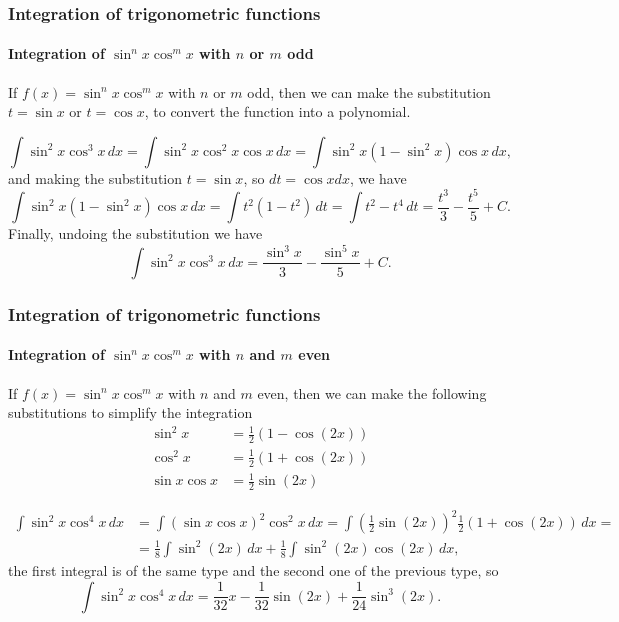 \begin{frame}
\frametitle{Integration of trigonometric functions}
\framesubtitle{Integration of $\sin^n x\cos^m x$ with $n$ or $m$ odd}
If $f(x)=\sin^n x\cos^m x$ with $n$ or $m$ odd, then we can make the substitution $t=\sin x$ or
$t=\cos x$, to convert the function into a polynomial.

\[
\int \sin^2 x\cos^3 x\, dx = \int \sin^2 x\cos^2 x\cos x\, dx = \int \sin^2 x(1-\sin^2 x)\cos x\, dx,
\]
and making the substitution $t=\sin x$, so $dt = \cos x dx$, we have
\[
\int \sin^2 x(1-\sin^2 x)\cos x\, dx = \int t^2(1-t^2)\, dt = \int t^2-t^4 \, dt = \frac{t^3}{3}-\frac{t^5}{5}+C.
\]
Finally, undoing the substitution we have
\[
\int \sin^2 x\cos^3 x\, dx = \frac{\sin^3 x}{3}-\frac{\sin^5 x}{5}+C.
\]
\end{frame}


\begin{frame}
\frametitle{Integration of trigonometric functions}
\framesubtitle{Integration of $\sin^n x\cos^m x$ with $n$ and $m$ even}
If $f(x)=\sin^n x\cos^m x$ with $n$ and $m$ even, then we can make the following substitutions to simplify the integration 
\begin{align*}
\sin^2 x &= \frac{1}{2}(1-\cos(2x))\\
\cos^2 x &= \frac{1}{2}(1+\cos(2x))\\
\sin x\cos x &= \frac{1}{2}\sin(2x)
\end{align*}

\begin{align*}
\int \sin^2 x\cos^4 x\, dx &= \int (\sin x\cos x)^2\cos^2 x\, dx = \int \left(\frac{1}{2}\sin(2x)\right)^2\frac{1}{2}(1+\cos(2x))\,dx =\\
&= \frac{1}{8}\int \sin^2(2x)\,dx+\frac{1}{8}\int \sin^2(2x) \cos(2x)\,dx,
\end{align*}
the first integral is of the same type and the second one of the previous type, so
\[
\int \sin^2 x\cos^4 x\, dx = \frac{1}{32}x-\frac{1}{32}\sin(2x)+\frac{1}{24}\sin^3(2x).
\] 
\end{frame}


